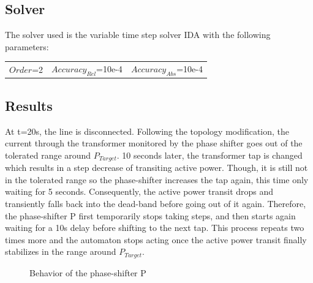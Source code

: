 \documentclass[a4paper, 12pt]{report}
\begin{document}
\subsection{Solver}
The solver used is the variable time step solver IDA with the following parameters:
\begin{center}
\begin{tabular}{l|l|l}
   $Order$=2 & $Accuracy_{Rel}$=10e-4 & $Accuracy_{Abs}$=10e-4 \\
\end{tabular}
\end{center}

\newpage
\subsection{Results}

At t=20s, the line is disconnected. Following the topology modification, the current through the transformer monitored by the phase shifter goes out of the tolerated range around $P_{Target}$.  10 seconds later, the transformer tap is changed which results in a step decrease of transiting active power. Though, it is still not in the tolerated range so the phase-shifter increases the tap again, this time only waiting for 5 seconds. Consequently, the active power transit drops and transiently falls back into the dead-band before going out of it again. Therefore, the phase-shifter P first temporarily stops taking steps, and then starts again waiting for a 10s delay before shifting to the next tap. This process repeats two times more and the automaton stops acting once the active power transit finally stabilizes in the range around $P_{Target}$. \\

\begin{figure}[H]
\caption{Behavior of the phase-shifter P}
\end{figure}
\end{document}
